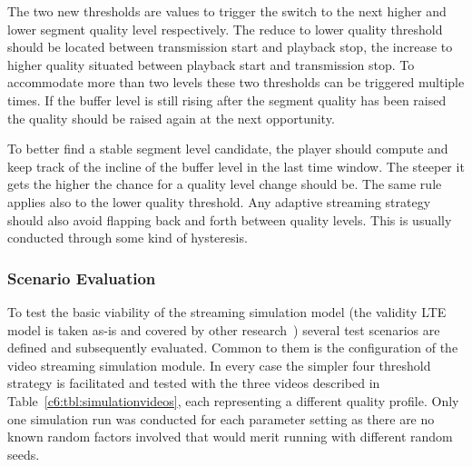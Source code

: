 The two new thresholds are values to trigger the switch to the next higher and lower segment quality level respectively. The reduce to lower quality threshold should be located between transmission start and playback stop, the increase to higher quality situated between playback start and transmission stop. To accommodate more than two levels these two thresholds can be triggered multiple times. If the buffer level is still rising after the segment quality has been raised the quality should be raised again at the next opportunity.

To better find a stable segment level candidate, the player should compute and keep track of the incline of the buffer level in the last time window. The steeper it gets the higher the chance for a quality level change should be. The same rule applies also to the lower quality threshold. Any adaptive streaming strategy should also avoid flapping back and forth between quality levels. This is usually conducted through some kind of hysteresis.



\subsubsection{Scenario Evaluation}

To test the basic viability of the streaming simulation model (the validity \gls{LTE} model is taken as-is and covered by other research~\cite{Baldo:2013:OSM:2507924.2507940}) several test scenarios are defined and subsequently evaluated. Common to them is the configuration of the video streaming simulation module. In every case the simpler four threshold strategy is facilitated and tested with the three videos described in Table~\ref{c6:tbl:simulationvideos}, each representing a different quality profile. Only one simulation run was conducted for each parameter setting as there are no known random factors involved that would merit running with different random seeds.

